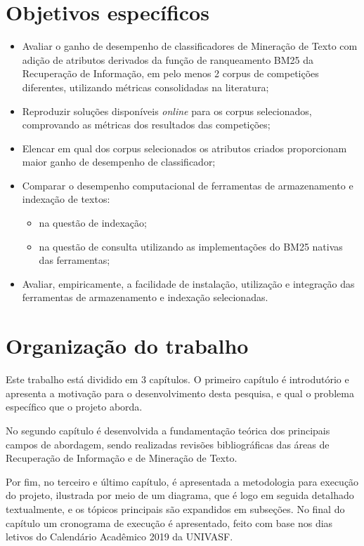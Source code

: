     \section{Objetivos específicos} \label{sec:Objetivos-específicos}
        \begin{itemize}
        	\item Avaliar o ganho de desempenho de classificadores de Mineração de Texto com adição de atributos derivados da função de ranqueamento BM25 da Recuperação de Informação, em pelo menos 2 corpus de competições diferentes, utilizando métricas consolidadas na literatura;
        	
        	\item Reproduzir soluções disponíveis \textit{online} para os corpus selecionados, comprovando as métricas dos resultados das competições;
        	
            \item Elencar em qual dos corpus selecionados os atributos criados proporcionam maior ganho de desempenho de classificador;
            
            \item Comparar o desempenho computacional de ferramentas de armazenamento e indexação de textos:
            \begin{itemize}
                \item na questão de indexação;
                \item na questão de consulta utilizando as implementações do BM25 nativas das ferramentas;
            \end{itemize}
            
            \item Avaliar, empiricamente, a facilidade de instalação, utilização e integração das ferramentas de armazenamento e indexação selecionadas.
        \end{itemize}
    
    \section{Organização do trabalho} \label{sec:Organização-do-trabalho}
        Este trabalho está dividido em 3 capítulos. O primeiro capítulo é introdutório e apresenta a motivação para o desenvolvimento desta pesquisa, e qual o problema específico que o projeto aborda.
        
        No segundo capítulo é desenvolvida a fundamentação teórica dos principais campos de abordagem, sendo realizadas revisões bibliográficas das áreas de Recuperação de Informação e de Mineração de Texto.
        
        Por fim, no terceiro e último capítulo, é apresentada a metodologia para execução do projeto, ilustrada por meio de um diagrama, que é logo em seguida detalhado textualmente, e os tópicos principais são expandidos em subseções.
        No final do capítulo um cronograma de execução é apresentado, feito com base nos dias letivos do Calendário Acadêmico 2019 da UNIVASF.
